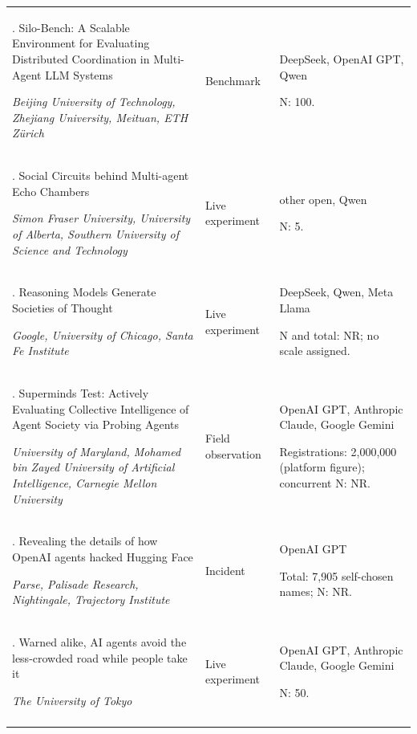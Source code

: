 \begin{longtable}{@{}>{\raggedright\arraybackslash}p{}>{\raggedright\arraybackslash}p{}>{\raggedright\arraybackslash}p{}@{}}
130. Silo-Bench: A Scalable Environment for Evaluating Distributed Coordination in Multi-Agent LLM Systems \citep{silo-bench}\par\emph{Beijing University of Technology, Zhejiang University, Meituan, ETH Zürich} & Benchmark & DeepSeek, OpenAI GPT, Qwen\par N: 100. \\ \addlinespace[2pt]
131. Social Circuits behind Multi-agent Echo Chambers \citep{social-circuits}\par\emph{Simon Fraser University, University of Alberta, Southern University of Science and Technology} & Live experiment & other open, Qwen\par N: 5. \\ \addlinespace[2pt]
132. Reasoning Models Generate Societies of Thought \citep{societies-of-thought}\par\emph{Google, University of Chicago, Santa Fe Institute} & Live experiment & DeepSeek, Qwen, Meta Llama\par N and total: NR; no scale assigned. \\ \addlinespace[2pt]
133. Superminds Test: Actively Evaluating Collective Intelligence of Agent Society via Probing Agents \citep{superminds-test}\par\emph{University of Maryland, Mohamed bin Zayed University of Artificial Intelligence, Carnegie Mellon University} & Field observation & OpenAI GPT, Anthropic Claude, Google Gemini\par Registrations: 2,000,000 (platform figure); concurrent N: NR. \\ \addlinespace[2pt]
134. Revealing the details of how OpenAI agents hacked Hugging Face \citep{swarmtraces}\par\emph{Parse, Palisade Research, Nightingale, Trajectory Institute} & Incident & OpenAI GPT\par Total: 7,905 self-chosen names; N: NR. \\ \addlinespace[2pt]
135. Warned alike, AI agents avoid the less-crowded road while people take it \citep{tokyo-road-game}\par\emph{The University of Tokyo} & Live experiment & OpenAI GPT, Anthropic Claude, Google Gemini\par N: 50. \\ \addlinespace[2pt]

\end{longtable}
